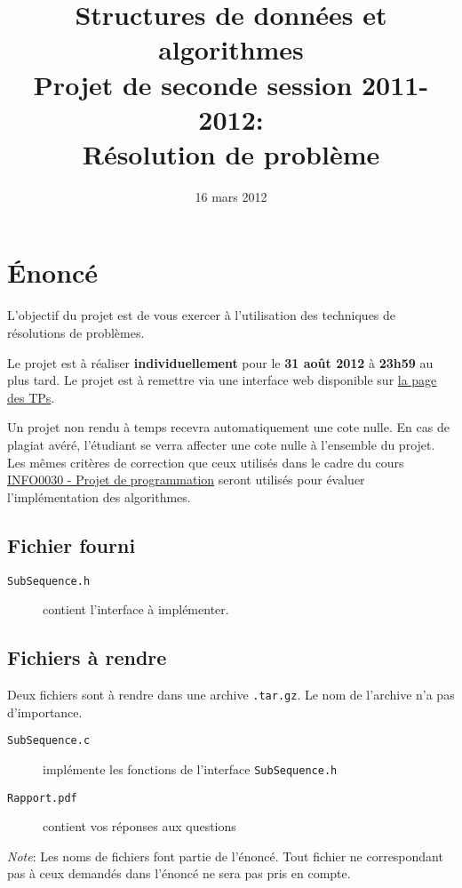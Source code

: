 \documentclass[a4paper,10pt]{article}
\title{
    \textbf{Structures de données et algorithmes}\\
    Projet de seconde session 2011-2012:\\Résolution de problème
}
\date{16 mars 2012}
\begin{document}
\maketitle

\section*{\'Enoncé}

L'objectif du projet est de vous exercer à l'utilisation des techniques de résolutions de problèmes.

Le projet est à réaliser {\bf individuellement} pour le {\bf 31 août
  2012} à {\bf 23h59} au plus tard. Le projet est à remettre via une
interface web disponible sur
\href{http://www.montefiore.ulg.ac.be/~glouppe/2011-2012/students.info0902.php}{la
  page des TPs}.

Un projet non rendu à temps recevra automatiquement une cote nulle. En cas de
plagiat avéré, l'étudiant se verra affecter une cote nulle à l'ensemble du
projet. Les mêmes critères de correction que ceux utilisés dans le cadre du
cours \href{http://www.montefiore.ulg.ac.be/~info0030/}{INFO0030 - Projet de programmation}
seront utilisés pour évaluer l'implémentation des algorithmes.

\subsection*{Fichier fourni}
\begin{description}
\item[\texttt{SubSequence.h}] contient l'interface à implémenter.
\end{description}
\subsection*{Fichiers à rendre}
Deux fichiers sont à rendre dans une archive \texttt{.tar.gz}. Le nom de l'archive n'a pas d'importance.
\begin{description}
\item[\texttt{SubSequence.c}] implémente les fonctions de l'interface \texttt{SubSequence.h}
\item[\texttt{Rapport.pdf}] contient vos réponses aux questions
\end{description}

{\em Note}: Les noms de fichiers font partie de l'énoncé. Tout fichier ne
correspondant pas à ceux demandés dans l'énoncé ne sera pas pris en compte.
\end{document}
